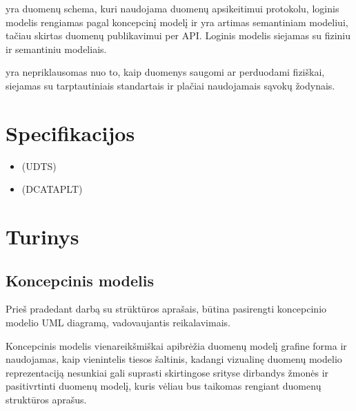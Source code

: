 \documentclass[letterpaper,10pt,lithuanian]{sphinxmanual}
\begin{document}
\sphinxAtStartPar
{} yra duomenų schema, kuri naudojama duomenų apsikeitimui
 protokolu, loginis modelis rengiamas pagal koncepcinį modelį ir yra
artimas semantiniam modeliui, tačiau skirtas duomenų publikavimui per API.
Loginis modelis siejamas su fiziniu ir semantiniu modeliais.

\sphinxAtStartPar
{} yra nepriklausomas nuo to, kaip duomenys saugomi ar
perduodami fiziškai, siejamas su tarptautiniais standartais ir plačiai
naudojamais sąvokų žodynais.


\chapter{Specifikacijos}
\label{\detokenize{index:specifikacijos}}\begin{itemize}
\item {} 
\sphinxAtStartPar
{} (UDTS)

\item {} 
\sphinxAtStartPar
{} (DCAT\sphinxhyphen{}AP\sphinxhyphen{}LT)

\end{itemize}


\chapter{Turinys}
\label{\detokenize{index:turinys}}
\sphinxstepscope


\section{Koncepcinis modelis}
\label{\detokenize{modelis:koncepcinis-modelis}}\label{\detokenize{modelis:uml-index}}\label{\detokenize{modelis::doc}}
\sphinxAtStartPar
Prieš pradedant darbą su strūktūros aprašais, būtina pasirengti koncepcinio
modelio UML diagramą, vadovaujantis 
reikalavimais.

\sphinxAtStartPar
Koncepcinis modelis vienareikšmiškai apibrėžia duomenų modelį grafine forma ir
naudojamas, kaip vienintelis tiesos šaltinis, kadangi vizualinę duomenų modelio
reprezentaciją nesunkiai gali suprasti skirtingose srityse dirbandys žmonės ir
pasitivrtinti duomenų modelį, kuris vėliau bus taikomas rengiant duomenų
struktūros aprašus.
\end{document}

